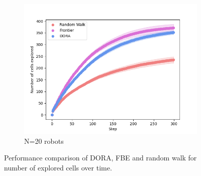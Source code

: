 \documentclass[letterpaper, 10 pt, conference]{ieeeconf}
\begin{document}
\begin{figure}
\begin{subfigure}{0.32\textwidth}
        \includegraphics[width=\textwidth]{images/explored_20.png}
        \caption{N=20 robots}
        \label{results:explored20}
    \end{subfigure}
    \caption{Performance comparison of DORA, FBE and random walk for number of explored cells over time.}
\end{figure}
\end{document}
